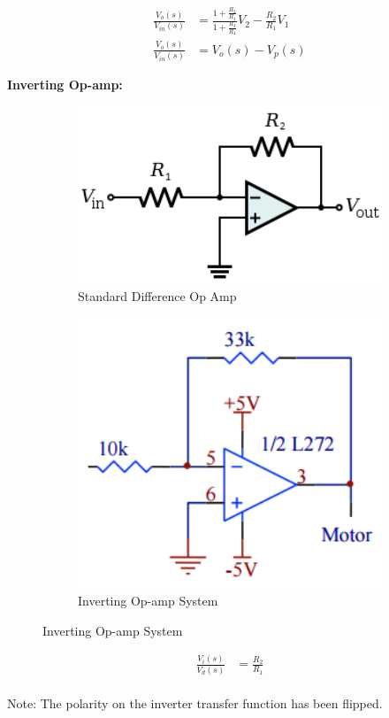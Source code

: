 \documentclass[11pt,a4paper]{article}
\begin{document}
\begin{enumerate}
    \begin{align*}
    \frac{V_{o}(s)}{V_{in}(s)} &= \frac{1+\frac{R_2}{R_1}}{1+\frac{R_3}{R_4}}V_2 - \frac{R_2}{R_1}V_1\\
	\frac{V_{o}(s)}{V_{in}(s)} &= V_{o}(s) - V_{p}(s)
	\end{align*}
    
    \textbf{Inverting Op-amp:}\\
    \begin{figure}[H]
    \centering
		\begin{subfigure}{0.4\textwidth}
		\includegraphics[width=1\textwidth]{FigsC/invertingOpAmp.png}
		\caption{Standard Difference Op Amp}
		\label{fig:subim1}
		\end{subfigure}
		\begin{subfigure}{0.4\textwidth}
		\includegraphics[width=1\textwidth]{FigsC/c2a.png}
		\caption{Inverting Op-amp System}
		\label{fig:subim1}
		\end{subfigure}		
	\caption{\label{fig:diffamp}Inverting Op-amp System}
	\end{figure}
    \begin{align*}
	\frac{V_{i}(s)}{V_{d}(s)} &= \frac{R_2}{R_1}
	\end{align*}\\
	Note: The polarity on the inverter transfer function has been flipped.
    

\end{enumerate}
\end{document}
